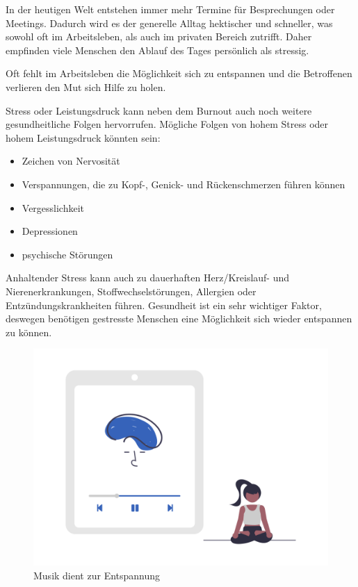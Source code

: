 
In der heutigen Welt entstehen immer mehr Termine für Besprechungen oder Meetings. 
Dadurch wird es der generelle Alltag hektischer und schneller, was sowohl oft im Arbeitsleben, als auch im 
privaten Bereich zutrifft. Daher empfinden viele Menschen den Ablauf des Tages persönlich als stressig.

Oft fehlt im Arbeitsleben die Möglichkeit sich zu entspannen und die Betroffenen verlieren den Mut sich
Hilfe zu holen.

Stress oder Leistungsdruck kann neben dem Burnout auch noch weitere gesundheitliche Folgen hervorrufen.
Mögliche Folgen von hohem Stress oder hohem Leistungsdruck könnten sein:

\begin{itemize}
    \item Zeichen von Nervosität
    \item Verspannungen, die zu Kopf-, Genick- und Rückenschmerzen führen können
    \item Vergesslichkeit
    \item Depressionen
    \item psychische Störungen
\end{itemize}

Anhaltender Stress kann auch zu dauerhaften Herz/Kreislauf- und Nierenerkrankungen, Stoffwechselstörungen, 
Allergien oder Entzündungskrankheiten führen. \cite{stress} 
Gesundheit ist ein sehr wichtiger Faktor, deswegen benötigen gestresste Menschen eine Möglichkeit sich
wieder entspannen zu können.

\begin{figure}[H]
    \centering
    \includegraphics[height=0.35\textwidth]{./pics/undraw_Meditating_re_aiqa.png}
    \caption{Musik dient zur Entspannung}
\end{figure}

